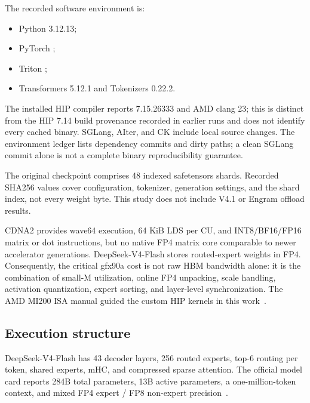 \documentclass[sigplan,10pt]{acmart}
\begin{document}
The recorded software environment is:
\begin{itemize}
  \item Python 3.12.13;
  \item PyTorch ;
  \item Triton ;
  \item Transformers 5.12.1 and Tokenizers 0.22.2.
\end{itemize}
The installed HIP compiler reports 7.15.26333 and AMD clang 23; this is distinct from the HIP 7.14 build provenance recorded in earlier runs and does not identify every cached binary. SGLang, AIter, and CK include local source changes. The environment ledger lists dependency commits and dirty paths; a clean SGLang commit alone is not a complete binary reproducibility guarantee.

The original checkpoint comprises 48 indexed safetensors shards. Recorded SHA256 values cover configuration, tokenizer, generation settings, and the shard index, not every weight byte. This study does not include V4.1 or Engram offload results.

CDNA2 provides wave64 execution, 64 KiB LDS per CU, and INT8/BF16/FP16 matrix or dot instructions, but no native FP4 matrix core comparable to newer accelerator generations. DeepSeek-V4-Flash stores routed-expert weights in FP4. Consequently, the critical gfx90a cost is not raw HBM bandwidth alone: it is the combination of small-M utilization, online FP4 unpacking, scale handling, activation quantization, expert sorting, and layer-level synchronization. The AMD MI200 ISA manual guided the custom HIP kernels in this work~\cite{amdisa}.

\subsection{Execution structure}

DeepSeek-V4-Flash has 43 decoder layers, 256 routed experts, top-6 routing per token, shared experts, mHC, and compressed sparse attention. The official model card reports 284B total parameters, 13B active parameters, a one-million-token context, and mixed FP4 expert / FP8 non-expert precision~\cite{dsv4card}.
\end{document}

